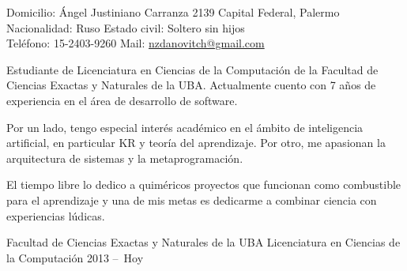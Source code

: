 \documentclass[10pt,a4paper]{article}
\begin{document}
\sloppy



\nobreakvspace{0.3em}

\noindent
Domicilio: Ángel Justiniano Carranza 2139 \sbull
Capital Federal, Palermo \\
Nacionalidad: Ruso \sbull
Estado civil: Soltero sin hijos \\
Teléfono: 15-2403-9260 \sbull
Mail: \href{mailto:nzdanovitch.at.gmail.dot.com}{nzdanovitch\mbox{}@\mbox{}gmail.com}


\spacedhrule{1.2em}{-0.4em} %





\vspace{-1.3em}
\begin{multicols}{2}
\noindent

Estudiante de Licenciatura en Ciencias de la Computación de la Facultad de
Ciencias Exactas y Naturales de la UBA. Actualmente cuento con 7 años de
experiencia en el área de desarrollo de software.

Por un lado, tengo especial interés académico en el ámbito de inteligencia
artificial, en particular KR y teoría del aprendizaje. Por otro, me apasionan
la arquitectura de sistemas y la metaprogramación.

El tiempo libre lo dedico a quiméricos proyectos que funcionan como
combustible para el aprendizaje y una de mis metas es dedicarme a combinar
ciencia con experiencias lúdicas.


% 

\end{multicols}


\spacedhrule{0.3em}{-0.4em} %




\vspace{0.2em}
\headedsection
  { Facultad de Ciencias Exactas y Naturales de la UBA }
  { \textsc{} } {%
  \headedsubsection
    { Licenciatura en Ciencias de la Computación }
    { 2013 --\ Hoy \ }{}
}
\end{document}
